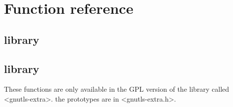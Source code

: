 \chapter{Function reference}

\section{\gnutls{} library}


\section{\gnutlse{} library}
These functions are only available in the GPL version of the
library called <gnutls-extra>. the prototypes are in <gnutls-extra.h>.




